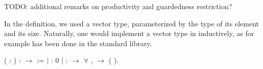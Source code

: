 TODO: additional remarks on productivity and guardedness restriction?

In the  definition, we used a vector
type, parameterized by the type of its element and its size. Naturally, one
would implement a vector type in \Coq inductively, as for example has been
done in the standard library.
\begin{singlespace}
\begin{coqdoccode}
\coqdocnoindent
{} 
( : ) :
\ensuremath{\rightarrow}  :=\coqdoceol
\coqdocindent{1.00em}
\ensuremath{|}   :
  0\coqdoceol
\coqdocindent{1.00em}
\ensuremath{|}  :
 \ensuremath{\rightarrow} \ensuremath{\forall} ,
 
 \ensuremath{\rightarrow}
 
(
).\coqdoceol
\end{coqdoccode}
\end{singlespace}

